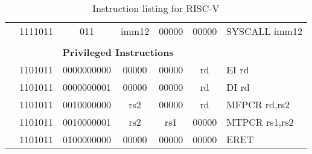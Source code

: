 \begin{table}[p]
\begin{small}
\begin{center}
\begin{tabular}{rcccccccccl}
&
\multicolumn{1}{|c|}{1111011} &
\multicolumn{2}{c|}{011} &
\multicolumn{4}{c|}{imm12} &
\multicolumn{1}{c|}{00000} &
\multicolumn{1}{c|}{00000} & SYSCALL imm12 \\
\cline{2-10}
  

&
\multicolumn{9}{c}{} & \\
&
\multicolumn{9}{c}{\bf Privileged Instructions} & \\
\cline{2-10}
  

&
\multicolumn{1}{|c|}{1101011} &
\multicolumn{5}{c|}{0000000000} &
\multicolumn{1}{c|}{00000} &
\multicolumn{1}{c|}{00000} &
\multicolumn{1}{c|}{rd} & EI rd \\
\cline{2-10}
  

&
\multicolumn{1}{|c|}{1101011} &
\multicolumn{5}{c|}{0000000001} &
\multicolumn{1}{c|}{00000} &
\multicolumn{1}{c|}{00000} &
\multicolumn{1}{c|}{rd} & DI rd \\
\cline{2-10}
  

&
\multicolumn{1}{|c|}{1101011} &
\multicolumn{5}{c|}{0010000000} &
\multicolumn{1}{c|}{rs2} &
\multicolumn{1}{c|}{00000} &
\multicolumn{1}{c|}{rd} & MFPCR rd,rs2 \\
\cline{2-10}
  

&
\multicolumn{1}{|c|}{1101011} &
\multicolumn{5}{c|}{0010000001} &
\multicolumn{1}{c|}{rs2} &
\multicolumn{1}{c|}{rs1} &
\multicolumn{1}{c|}{00000} & MTPCR rs1,rs2 \\
\cline{2-10}
  

&
\multicolumn{1}{|c|}{1101011} &
\multicolumn{5}{c|}{0100000000} &
\multicolumn{1}{c|}{00000} &
\multicolumn{1}{c|}{00000} &
\multicolumn{1}{c|}{00000} & ERET  \\
\cline{2-10}
  

\end{tabular}
\end{center}
\end{small}
\caption{Instruction listing for RISC-V}
\label{instr-table}
\end{table}
  
